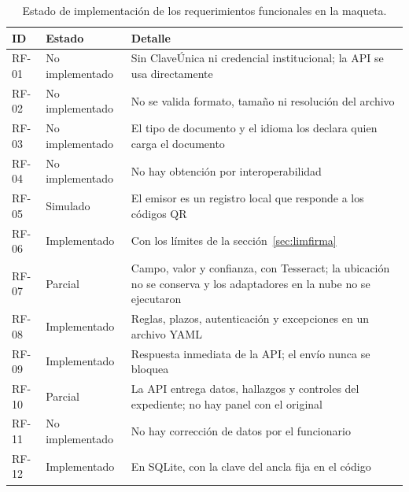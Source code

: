 \documentclass[11pt,a4paper]{article}
\begin{document}
\begin{table}[!htbp]
\centering
\caption{Estado de implementación de los requerimientos funcionales en la maqueta.}
\label{tab:implementacion}
\small
\begin{tabularx}{\textwidth}{>{\raggedright\arraybackslash}p{1.3cm} >{\raggedright\arraybackslash}p{2.6cm} L}
\toprule
\textbf{ID} & \textbf{Estado} & \textbf{Detalle} \\
\midrule
RF-01 & No implementado & Sin ClaveÚnica ni credencial institucional; la API se usa directamente \\
RF-02 & No implementado & No se valida formato, tamaño ni resolución del archivo \\
RF-03 & No implementado & El tipo de documento y el idioma los declara quien carga el documento \\
RF-04 & No implementado & No hay obtención por interoperabilidad \\
RF-05 & Simulado & El emisor es un registro local que responde a los códigos QR \\
RF-06 & Implementado & Con los límites de la sección~\ref{sec:limfirma} \\
RF-07 & Parcial & Campo, valor y confianza, con Tesseract; la ubicación no se conserva y los adaptadores en la nube no se ejecutaron \\
RF-08 & Implementado & Reglas, plazos, autenticación y excepciones en un archivo YAML \\
RF-09 & Implementado & Respuesta inmediata de la API; el envío nunca se bloquea \\
RF-10 & Parcial & La API entrega datos, hallazgos y controles del expediente; no hay panel con el original \\
RF-11 & No implementado & No hay corrección de datos por el funcionario \\
RF-12 & Implementado & En SQLite, con la clave del ancla fija en el código \\
\bottomrule
\end{tabularx}
\end{table}
\end{document}
